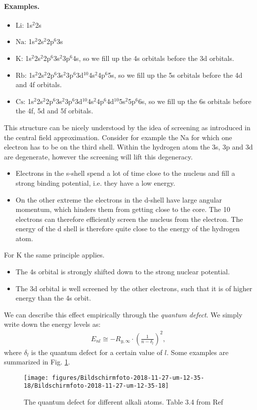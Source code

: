 \documentclass[10pt]{article}
\let\cite\citep
\providecommand\citep{\cite}
\newcommand*\ch[1]{\ensuremath{\mathrm{#1}}}
\begin{document}
\paragraph{Examples.}
\begin{itemize}
\item \ch{Li}: 1s$^2$2s
\item \ch{Na}: 1s$^2$2s$^2$2p$^6$3s
\item \ch{K}: 1s$^2$2s$^2$2p$^6$3s$^2$3p$^6$4s, so we fill up the 4s orbitals before the 3d orbitals.
\item \ch{Rb}: 1s$^2$2s$^2$2p$^6$3s$^2$3p$^6$3d$^{10}$4s$^2$4p$^6$5s, so we fill up the 5s orbitals before the 4d and 4f orbitals.
\item \ch{Cs}: 1s$^2$2s$^2$2p$^6$3s$^2$3p$^6$3d$^{10}$4s$^2$4p$^6$4d$^{10}$5s$^{2}$5p$^6$6s, so we fill up the 6s orbitals before the 4f, 5d and 5f orbitals.
\end{itemize}
This structure can be nicely understood by the idea of screening as introduced in the central field approximation. Consider for example the \ch{Na} for which one electron has to be on the third shell. Within the hydrogen atom the 3s, 3p and 3d are degenerate, however the screening will lift this degeneracy.
\begin{itemize}
\item Electrons in the s-shell spend a lot of time close to the nucleus and fill a strong binding potential, i.e. they have a low energy.
\item On the other extreme the electrons in the d-shell have large angular momentum, which hinders them from getting close to the core. The 10 electrons can therefore efficiently screen the nucleus from the electron. The energy of the d shell is therefore quite close to the energy of the hydrogen atom.
\end{itemize}

For \ch{K} the same principle applies. 
\begin{itemize}
\item The 4s orbital is strongly shifted down to the strong nuclear potential.
\item The 3d orbital is well screened by the other electrons, such that it is of higher energy than the 4s orbit.
\end{itemize}
We can describe this effect empirically through the \textit{quantum defect}. We simply write down the energy levels as:
\begin{align}
E_{nl} \cong -  R_{y,\infty} \cdot \left( \frac{1}{n-\delta_l} \right)^2,
\end{align}
where $\delta_l$ is the quantum defect for a certain value of $l$. Some examples are summarized in Fig. \ref{610998}.
\begin{figure}[h!]
\begin{center}
\texttt{[image: figures/Bildschirmfoto-2018-11-27-um-12-35-18/Bildschirmfoto-2018-11-27-um-12-35-18]}
\caption{{The quantum defect for different alkali atoms. Table 3.4 from Ref
\protect\cite{Hertel_2015a}
{\label{610998}}%
}}
\end{center}
\end{figure}
\end{document}
